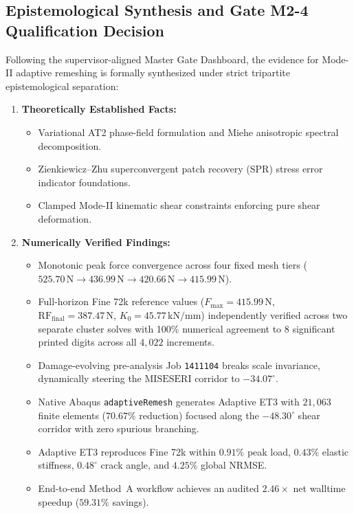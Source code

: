 \subsection{Epistemological Synthesis and Gate M2-4 Qualification Decision}
\label{subsec:mode2_gate_m2_4_decision}

Following the supervisor-aligned Master Gate Dashboard, the evidence for Mode-II adaptive remeshing is formally synthesized under strict tripartite epistemological separation:

\begin{enumerate}
  \item \textbf{Theoretically Established Facts:}
  \begin{itemize}
    \item Variational AT2 phase-field formulation and Miehe anisotropic spectral decomposition.
    \item Zienkiewicz--Zhu superconvergent patch recovery (SPR) stress error indicator foundations.
    \item Clamped Mode-II kinematic shear constraints enforcing pure shear deformation.
  \end{itemize}
  \item \textbf{Numerically Verified Findings:}
  \begin{itemize}
    \item Monotonic peak force convergence across four fixed mesh tiers ($525.70\,\mathrm{N} \to 436.99\,\mathrm{N} \to 420.66\,\mathrm{N} \to 415.99\,\mathrm{N}$).
    \item Full-horizon Fine 72k reference values ($F_{\max} = 415.99\,\mathrm{N}$, $\mathrm{RF}_{\mathrm{final}} = 387.47\,\mathrm{N}$, $K_0 = 45.77\,\mathrm{kN/mm}$) independently verified across two separate cluster solves with 100\% numerical agreement to 8 significant printed digits across all $4{,}022$ increments.
    \item Damage-evolving pre-analysis Job \texttt{1411104} breaks scale invariance, dynamically steering the $\mathrm{MISESERI}$ corridor to $-34.07^\circ$.
    \item Native Abaqus \texttt{adaptiveRemesh} generates Adaptive ET3 with $21{,}063$ finite elements ($70.67\%$ reduction) focused along the $-48.30^\circ$ shear corridor with zero spurious branching.
    \item Adaptive ET3 reproduces Fine 72k within $0.91\%$ peak load, $0.43\%$ elastic stiffness, $0.48^\circ$ crack angle, and $4.25\%$ global NRMSE.
    \item End-to-end Method~A workflow achieves an audited $2.46\times$ net walltime speedup ($59.31\%$ savings).

\end{itemize}
\end{enumerate}
